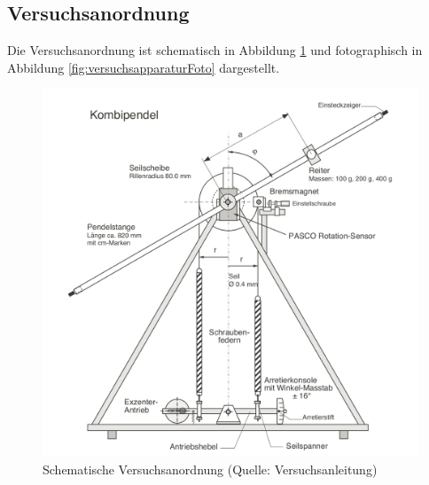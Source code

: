 \subsection{Versuchsanordnung}
\label{subsec:versuchsanordnung}

Die       Versuchsanordnung      ist       schematisch      in       Abbildung
\ref{fig:versuchsapparaturSchema}     und    fotographisch     in    Abbildung
\ref{fig:versuchsapparaturFoto} dargestellt.

\begin{figure}[h!]
    \centering
    \includegraphics[width=.8\textwidth]{images/versuchsapparatur-schema.png}
    \caption{%
        Schematische Versuchsanordnung (Quelle: Versuchsanleitung)
    }
    \label{fig:versuchsapparaturSchema}
\end{figure}

